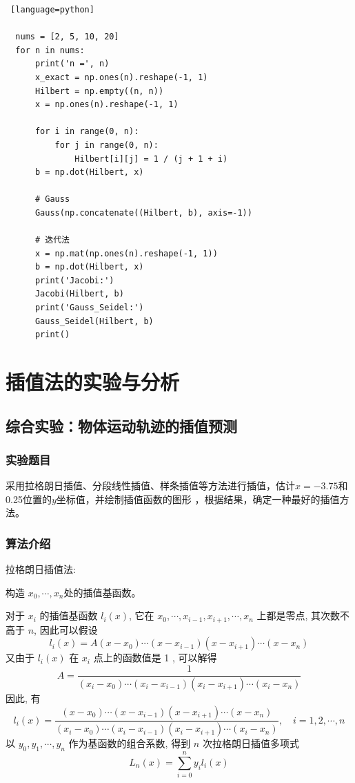 \documentclass[UTF8]{ctexart}
\begin{document}
\begin{lstlisting} [language=python]
  
  nums = [2, 5, 10, 20]
  for n in nums:
      print('n =', n)
      x_exact = np.ones(n).reshape(-1, 1)
      Hilbert = np.empty((n, n))
      x = np.ones(n).reshape(-1, 1)
  
      for i in range(0, n):
          for j in range(0, n):
              Hilbert[i][j] = 1 / (j + 1 + i)
      b = np.dot(Hilbert, x)
  
      # Gauss
      Gauss(np.concatenate((Hilbert, b), axis=-1))
  
      # 迭代法
      x = np.mat(np.ones(n).reshape(-1, 1))
      b = np.dot(Hilbert, x)
      print('Jacobi:')
      Jacobi(Hilbert, b)
      print('Gauss_Seidel:')
      Gauss_Seidel(Hilbert, b)
      print()
\end{lstlisting}

\newpage

\section{插值法的实验与分析}
\subsection{综合实验：物体运动轨迹的插值预测}
\subsubsection{实验题目}
采用拉格朗日插值、分段线性插值、样条插值等方法进行插值，估计$x=-3.75$和0.25位置的$y$坐标值，并绘制插值函数的图形
，根据结果，确定一种最好的插值方法。
\subsubsection{算法介绍}
拉格朗日插值法:

构造 $x_{0}, \cdots, x_{n}$处的插值基函数。

对于 $x_{i}$ 的插值基函数 $l_{i}(x)$, 它在 $x_{0}, \cdots, x_{i-1}, x_{i+1}, \cdots, x_{n}$ 上都是零点, 其次数不高于 $n$, 因此可以假设
$$
l_{i}(x)=A\left(x-x_{0}\right) \cdots\left(x-x_{i-1}\right)\left(x-x_{i+1}\right) \cdots\left(x-x_{n}\right)
$$
又由于 $l_{i}(x)$ 在 $x_{i}$ 点上的函数值是 1 , 可以解得
$$
A=\frac{1}{\left(x_{i}-x_{0}\right) \cdots\left(x_{i}-x_{i-1}\right)\left(x_{i}-x_{i+1}\right) \cdots\left(x_{i}-x_{n}\right)}
$$
因此, 有
$$
l_{i}(x)=\frac{\left(x-x_{0}\right) \cdots\left(x-x_{i-1}\right)\left(x-x_{i+1}\right) \cdots\left(x-x_{n}\right)}{\left(x_{i}-x_{0}\right) \cdots\left(x_{i}-x_{i-1}\right)\left(x_{i}-x_{i+1}\right) \cdots\left(x_{i}-x_{n}\right)}, \quad i=1,2, \cdots, n
$$
以 $y_{0}, y_{1}, \cdots, y_{n}$ 作为基函数的组合系数, 得到 $n$ 次拉格朗日插值多项式
$$
L_{n}(x)=\sum_{i=0}^{n} y_{i} l_{i}(x)
$$
\end{document}
